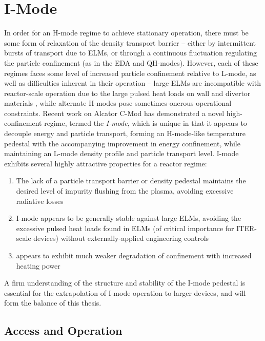 \section{I-Mode}\label{sec:hcr_imode}

In order for an H-mode regime to achieve stationary operation, there must be some form of relaxation of the density transport barrier -- either by intermittent bursts of transport due to ELMs, or through a continuous fluctuation regulating the particle confinement (as in the EDA and QH-modes).  However, each of these regimes faces some level of increased particle confinement relative to L-mode, as well as difficulties inherent in their operation -- large ELMs are incompatible with reactor-scale operation due to the large pulsed heat loads on wall and divertor materials \cite{Federici2003,Loarte2003}, while alternate H-modes pose sometimes-onerous operational constraints.  Recent work on Alcator C-Mod has demonstrated a novel high-confinement regime, termed the \emph{I-mode}, which is unique in that it appears to decouple energy and particle transport, forming an H-mode-like temperature pedestal with the accompanying improvement in energy confinement, while maintaining an L-mode density profile and particle 
transport level.  I-mode exhibits several highly attractive properties for a reactor regime:

\begin{enumerate}
 \item The lack of a particle transport barrier or density pedestal maintains the desired level of impurity flushing from the plasma, avoiding excessive radiative losses
 \item I-mode appears to be generally stable against large ELMs, avoiding the excessive pulsed heat loads found in ELMs (of critical importance for ITER-scale devices) without externally-applied engineering controls
 \item appears to exhibit much weaker degradation of confinement with increased heating power
\end{enumerate}

\noindent A firm understanding of the structure and stability of the I-mode pedestal is essential for the extrapolation of I-mode operation to larger devices, and will form the balance of this thesis.

\subsection{Access and Operation}\label{subsec:hcr_imode_access}

